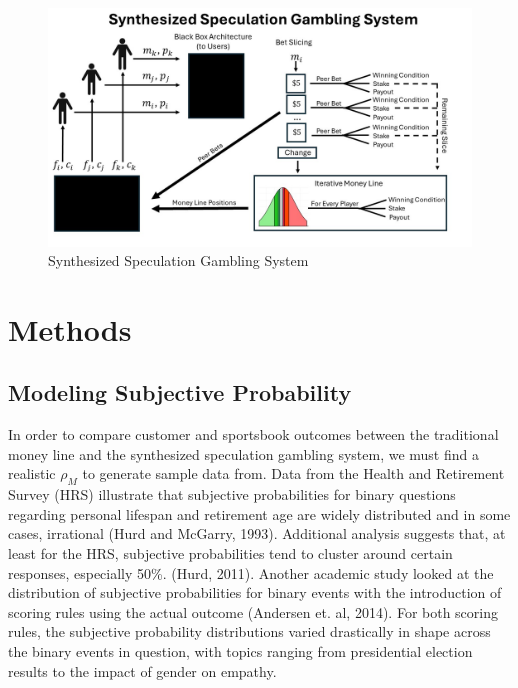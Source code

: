 \documentclass[sn-mathphys-num]{sn-jnl}
\theoremstyle{thmstyleone}%
\theoremstyle{thmstyletwo}%
\theoremstyle{thmstylethree}%
\begin{document}
\begin{figure}[H]
	\centering
	\includegraphics[width=14cm]{Synthesized Speculation Gambling System}
	\caption{Synthesized Speculation Gambling System}
\end{figure}

\section{Methods}

\subsection{Modeling Subjective Probability}

In order to compare customer and sportsbook outcomes between the traditional money line and the synthesized speculation gambling system, we must find a realistic $\rho_M$ to generate sample data from. Data from the Health and Retirement Survey (HRS) illustrate that subjective probabilities for binary questions regarding personal lifespan and retirement age are widely distributed and in some cases, irrational (Hurd and McGarry, 1993). Additional analysis suggests that, at least for the HRS, subjective probabilities tend to cluster around certain responses, especially 50\%. (Hurd, 2011). Another academic study looked at the distribution of subjective probabilities for binary events with the introduction of scoring rules using the actual outcome (Andersen et. al, 2014). For both scoring rules, the subjective probability distributions varied drastically in shape across the binary events in question, with topics ranging from presidential election results to the impact of gender on empathy.
\end{document}
